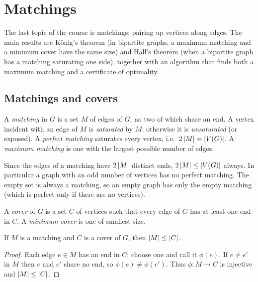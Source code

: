 \chapter{Matchings}


The last topic of the course is matchings: pairing up vertices along edges. The main results
are K\"onig's theorem (in bipartite graphs, a maximum matching and a minimum cover have the same
size) and Hall's theorem (when a bipartite graph has a matching saturating one side), together
with an algorithm that finds both a maximum matching and a certificate of optimality.

\section{Matchings and covers}

\begin{definition}[Matching]
A \emph{matching} in $G$ is a set $M$ of edges of $G$, no two of which share an end. A vertex
incident with an edge of $M$ is \emph{saturated} by $M$; otherwise it is \emph{unsaturated} (or
exposed). A \emph{perfect matching} saturates every vertex, i.e.\ $2\left\lvert M \right\rvert = \left\lvert V(G) \right\rvert$. A
\emph{maximum matching} is one with the largest possible number of edges.
\end{definition}

Since the edges of a matching have $2\left\lvert M \right\rvert$ distinct ends, $2\left\lvert M \right\rvert \le \left\lvert V(G) \right\rvert$ always. In
particular a graph with an odd number of vertices has no perfect matching. The empty set is
always a matching, so an empty graph has only the empty matching (which is perfect only if there
are no vertices).

\begin{definition}[Cover]
A \emph{cover} of $G$ is a set $C$ of vertices such that every edge of $G$ has at least one end
in $C$. A \emph{minimum cover} is one of smallest size.
\end{definition}

\begin{lemma}
If $M$ is a matching and $C$ is a cover of $G$, then $\left\lvert M \right\rvert \le \left\lvert C \right\rvert$.
\end{lemma}
\begin{proof}
Each edge $e \in M$ has an end in $C$; choose one and call it $\phi(e)$. If $e \ne e'$ in $M$
then $e$ and $e'$ share no end, so $\phi(e) \ne \phi(e')$. Thus $\phi : M \to C$ is injective
and $\left\lvert M \right\rvert\le\left\lvert C \right\rvert$.
\end{proof}

